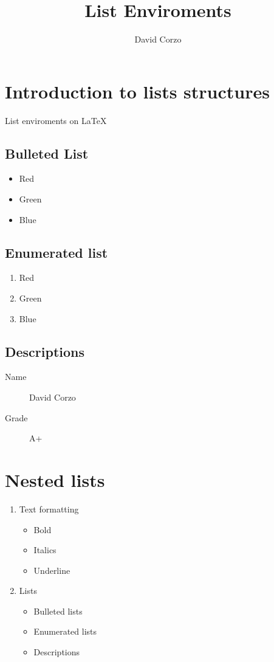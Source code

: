 \documentclass{article}
\title{List Enviroments}
\author{David Corzo}
\date{}
\begin{document}
\section{Introduction to lists structures}
List enviroments on \LaTeX

\subsection{Bulleted List}

\begin{itemize}
\item Red 
\item Green
\item Blue
\end{itemize}

\subsection{Enumerated list}
\begin{enumerate}
\item Red
\item Green
\item Blue
\end{enumerate}


\subsection{Descriptions}
\begin{description}
\item[Name] David Corzo
\item[Grade] A+
\end{description}

\section{Nested lists}
\begin{enumerate}

\item Text formatting
	\begin{itemize}
		\item Bold
		\item Italics
		\item Underline
	\end{itemize}

\item Lists
	\begin{itemize}
		\item Bulleted lists
		\item Enumerated lists
		\item Descriptions
	\end{itemize}

\end{enumerate}
\end{document}
